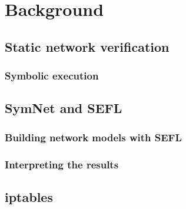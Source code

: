 \chapter{Background}\label{chapter:background}

\section{Static network verification}
\subsection{Symbolic execution}

\section{SymNet and SEFL}
\subsection{Building network models with SEFL}
\subsection{Interpreting the results}

\section{iptables}
